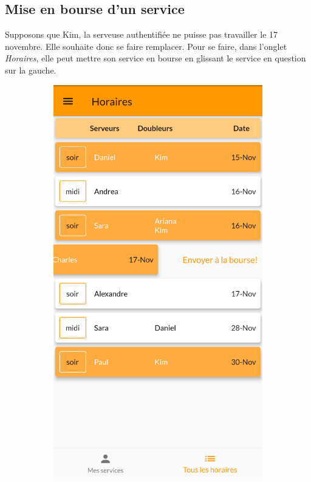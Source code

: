     \subsection*{Mise en bourse d'un service}
    Supposons que Kim, la serveuse authentifiée ne puisse pas travailler le 17 novembre.
    Elle souhaite donc se faire remplacer. Pour se faire, dans l'onglet 
    \textit{Horaires}, elle peut mettre son service en bourse en glissant le 
    service en question sur la gauche.
    \begin{figure}[!h]
        \centering
        \begin{subfigure}{.3\textwidth}
            \centering
            \includegraphics[width=0.9\linewidth]{screenshots/scenario_02/mise_en_bourse.png}

\end{subfigure}
\end{figure}
